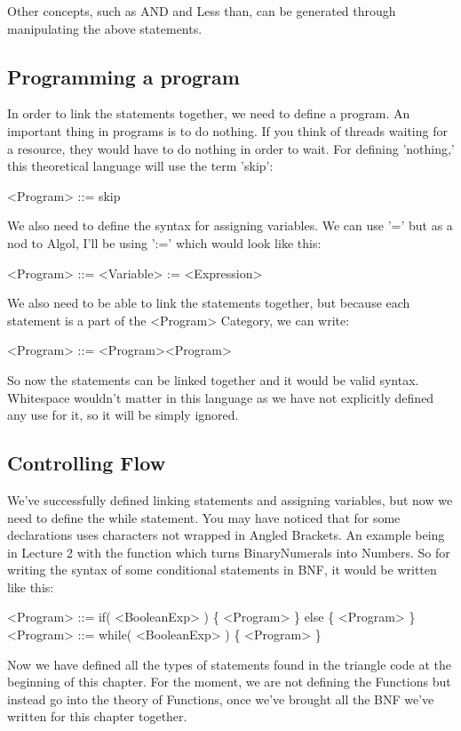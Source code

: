 \documentclass[12pt]{article}
\begin{document}
Other concepts, such as AND and Less than, can be generated through
manipulating the above statements.

\subsection{Programming a program}
\label{sec-3-5}
In order to link the statements together, we need to define a program.  An
important thing in programs is to do nothing.  If you think of threads waiting
for a resource, they would have to do nothing in order to wait.  For defining
'nothing,' this theoretical language will use the term 'skip':

<Program> ::= skip

We also need to define the syntax for assigning variables.  We can use '=' but
as a nod to Algol, I'll be using ':=' which would look like this:

<Program> ::= <Variable> := <Expression>

We also need to be able to link the statements together, but because each
statement is a part of the <Program> Category, we can write:

<Program> ::= <Program><Program>

So now the statements can be linked together and it would be valid syntax.
Whitespace wouldn't matter in this language as we have not explicitly defined
any use for it, so it will be simply ignored.

\subsection{Controlling Flow}
\label{sec-3-6}
We've successfully defined linking statements and assigning variables, but now
we need to define the while statement.  You may have noticed that for some
declarations uses characters not wrapped in Angled Brackets.  An example being
in Lecture 2 with the function which turns BinaryNumerals into Numbers.
So for writing the syntax of some conditional statements in BNF, it would be
written like this:

<Program> ::= if( <BooleanExp> ) \{ <Program> \} else \{ <Program> \}
<Program> ::= while( <BooleanExp> ) \{ <Program> \}

Now we have defined all the types of statements found in the triangle code at
the beginning of this chapter.  For the moment, we are not defining the
Functions but instead go into the theory of Functions, once we've brought all
the BNF we've written for this chapter together.
\end{document}
